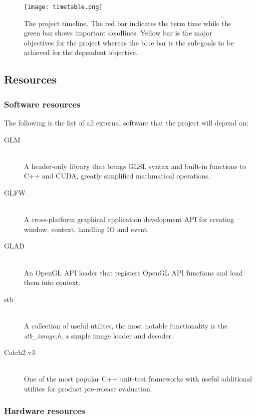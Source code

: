 \documentclass[oneside, a4paper]{article}
\begin{document}
    \begin{figure}[H]
        \texttt{[image: timetable.png]}
        \caption{The project timeline. The red bar indicates the term time while the green bar shows important deadlines. Yellow bar is the major objectives for the project whereas the blue bar is the sub-goals to be achieved for the dependent objective.}
    \end{figure}

    \subsection{Resources}

    \subsubsection{Software resources}

    The following is the list of all external software that the project will depend on:
    \begin{description}
        \item[GLM \cite{glm}] \hfill \\
            A header-only library that brings GLSL syntax and built-in functions to C++ and CUDA, greatly simplified mathmatical operations.
        \item[GLFW \cite{glfw}] \hfill \\
            A cross-platform graphical application development API for creating window, context, handling IO and event.
        \item[GLAD \cite{glad}] \hfill \\
            An OpenGL API loader that registers OpenGL API functions and load them into context.
        \item[stb \cite{stb}] \hfill \\
            A collection of useful utilites, the most notable functionality is the \textit{stb\_image.h}, a simple image loader and decoder.
        \item[Catch2 v3 \cite{catch2}] \hfill \\
            One of the most popular C++ unit-test frameworks with useful additional utilites for product pre-release evaluation.
    \end{description}

    \subsubsection{Hardware resources}
\end{document}
